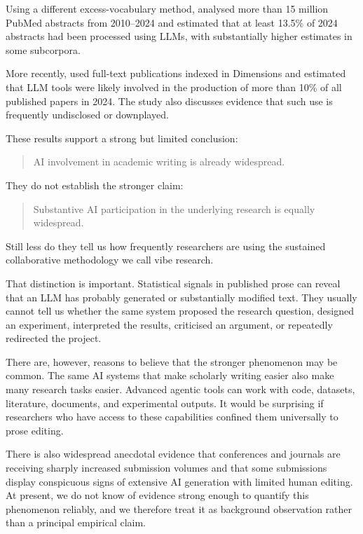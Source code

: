 Using a different excess-vocabulary method, \citet{kobakEtAl2024biomedical} analysed more than 15 million PubMed abstracts from 2010--2024 and estimated that at least 13.5\% of 2024 abstracts had been processed using LLMs, with substantially higher estimates in some subcorpora.

More recently, \citet{gray2025prevalence} used full-text publications indexed in Dimensions and estimated that LLM tools were likely involved in the production of more than 10\% of all published papers in 2024. The study also discusses evidence that such use is frequently undisclosed or downplayed.

These results support a strong but limited conclusion:

\begin{quote}
AI involvement in academic writing is already widespread.
\end{quote}

They do not establish the stronger claim:

\begin{quote}
Substantive AI participation in the underlying research is equally widespread.
\end{quote}

Still less do they tell us how frequently researchers are using the sustained collaborative methodology we call vibe research.

That distinction is important. Statistical signals in published prose can reveal that an LLM has probably generated or substantially modified text. They usually cannot tell us whether the same system proposed the research question, designed an experiment, interpreted the results, criticised an argument, or repeatedly redirected the project.

There are, however, reasons to believe that the stronger phenomenon may be common. The same AI systems that make scholarly writing easier also make many research tasks easier. Advanced agentic tools can work with code, datasets, literature, documents, and experimental outputs. It would be surprising if researchers who have access to these capabilities confined them universally to prose editing.

There is also widespread anecdotal evidence that conferences and journals are receiving sharply increased submission volumes and that some submissions display conspicuous signs of extensive AI generation with limited human editing. At present, we do not know of evidence strong enough to quantify this phenomenon reliably, and we therefore treat it as background observation rather than a principal empirical claim.

